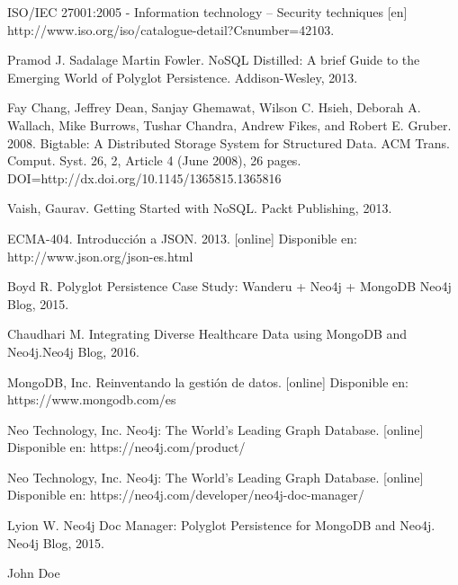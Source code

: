 \documentclass[conference]{IEEEtran}
\begin{document}
\begin{thebibliography}{1}

ISO/IEC 27001:2005 - Information technology -- Security    techniques [en]
\\
http://www.iso.org/iso/catalogue-detail?Csnumber=42103.

Pramod J. Sadalage Martin Fowler. NoSQL Distilled: A brief Guide to the Emerging
World of Polyglot Persistence. Addison-Wesley, 2013.

Fay Chang, Jeffrey Dean, Sanjay Ghemawat, Wilson C. Hsieh, Deborah A. Wallach, Mike Burrows, Tushar Chandra, Andrew Fikes, and Robert E. Gruber. 2008. Bigtable: A Distributed Storage System for Structured Data. ACM Trans. Comput. Syst. 26, 2, Article 4 (June 2008), 26 pages. DOI=http://dx.doi.org/10.1145/1365815.1365816

Vaish, Gaurav. Getting Started with NoSQL. Packt Publishing, 2013.

ECMA-404. Introducción a JSON. 2013. [online]
Disponible en: http://www.json.org/json-es.html

Boyd R. Polyglot Persistence Case Study: Wanderu + Neo4j + MongoDB Neo4j Blog, 2015.

Chaudhari M. Integrating Diverse Healthcare Data using MongoDB and Neo4j.Neo4j Blog, 2016.

MongoDB, Inc. Reinventando la gestión de datos. [online]
Disponible en: https://www.mongodb.com/es

Neo Technology, Inc. Neo4j: The World’s Leading Graph Database. [online]
Disponible en: https://neo4j.com/product/

Neo Technology, Inc. Neo4j: The World’s Leading Graph Database. [online]
Disponible en: https://neo4j.com/developer/neo4j-doc-manager/

Lyion W. Neo4j Doc Manager: Polyglot Persistence for MongoDB and Neo4j. Neo4j Blog, 2015.

\end{thebibliography}

\begin{IEEEbiography}{John Doe}
\blindtext
\end{IEEEbiography}
\end{document}
